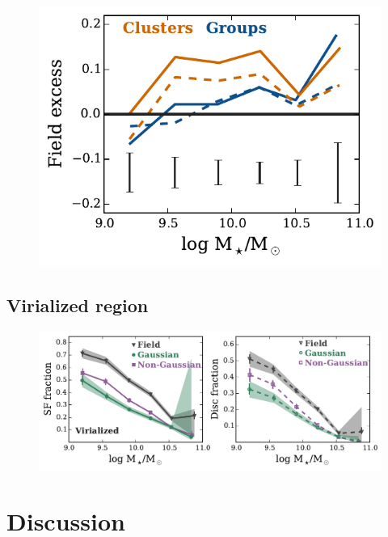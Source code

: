 \documentclass[a4paper,fleqn,usenatbib]{mnras}
\begin{document}
\begin{figure}
  \centering
  \includegraphics[width=\columnwidth]{mh_excess.pdf}
  \caption{}
  \label{fig:mh_excess}
\end{figure}

\subsection{Virialized region}

\begin{figure}
  \centering
  \includegraphics[width=\textwidth]{disk_sfFrac_w2_v.pdf}
  \caption{}
  \label{fig:disk_sfFrac_v}
\end{figure}


\section{Discussion}
\label{sec:discussion}

\end{document}
